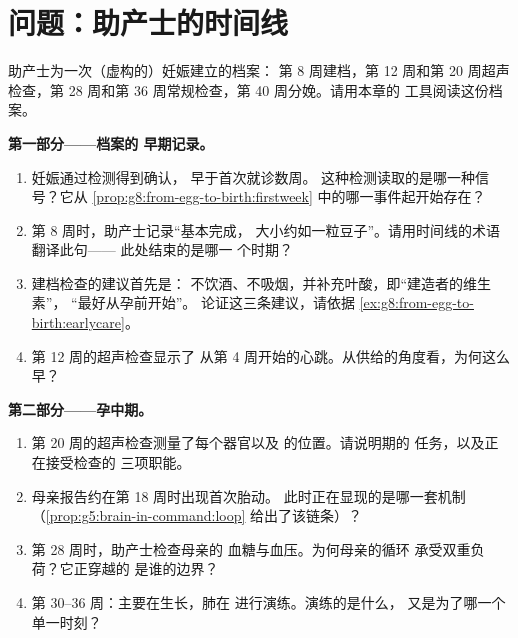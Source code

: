 \section{问题：助产士的时间线}

\begin{problem}\label{pb:g8:from-egg-to-birth:1}
助产士为一次（虚构的）妊娠建立的档案：
第 8 周建档，第 12 周和第 20 周超声检查，第 28
周和第 36 周常规检查，第 40 周分娩。请用本章的
工具阅读这份档案。

\medskip\noindent\textbf{第一部分——档案的
早期记录。}
\begin{enumerate}
  \item 妊娠通过检测得到确认，
        早于首次就诊数周。
        这种检测读取的是哪一种信号？它从
        \cref{prop:g8:from-egg-to-birth:firstweek}
        中的哪一事件起开始存在？
  \item 第 8 周时，助产士记录“基本完成，
        大小约如一粒豆子”。请用时间线的术语翻译此句——
        此处结束的是哪一
        个时期？
  \item 建档检查的建议首先是：
        不饮酒、不吸烟，并补充叶酸，即“建造者的维生素”，
        “最好从孕前开始”。
        论证这三条建议，请依据
        \cref{ex:g8:from-egg-to-birth:earlycare}。
  \item 第 12 周的超声检查显示了
        从第 4 周开始的心跳。从供给的角度看，为何这么早？
\end{enumerate}

\medskip\noindent\textbf{第二部分——孕中期。}
\begin{enumerate}[resume]
  \item 第 20 周的超声检查测量了每个器官以及
        的位置。请说明期的
        任务，以及正在接受检查的
        三项职能。
  \item 母亲报告约在第 18 周时出现首次胎动。
        此时正在显现的是哪一套机制
        （\cref{prop:g5:brain-in-command:loop}
        给出了该链条）？
  \item 第 28 周时，助产士检查母亲的
        血糖与血压。为何母亲的循环
        承受双重负荷？它正穿越的
        是谁的边界？
  \item 第 30--36 周：主要在生长，肺在
        进行演练。演练的是什么，
        又是为了哪一个单一时刻？
\end{enumerate}


\end{problem}
